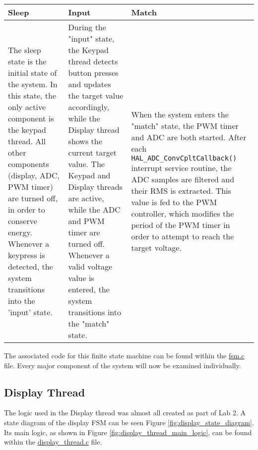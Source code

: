 \begin{tabular}{ p{} | p{} | p{}}
Sleep & Input & Match \\
\hline
The sleep state is the initial state of the system. In this state, the only active component is the keypad thread. All other components (display, ADC, PWM timer) are turned off, in order to conserve energy. Whenever a keypress is detected, the system transitions into the 'input' state.
&
During the "input" state, the Keypad thread detects button presses and updates the target value accordingly, while the Display thread shows the current target value. The Keypad and Display threads are active, while the ADC and PWM timer are turned off. Whenever a valid voltage value is entered, the system transitions into the "match" state.
&
When the system enters the "match" state, the PWM timer and ADC are both started. After each \verb|HAL_ADC_ConvCpltCallback()| interrupt service routine, the ADC samples are filtered and their RMS is extracted. This value is fed to the PWM controller, which modifies the period of the PWM timer in order to attempt to reach the target voltage.
\\
\end{tabular}


The associated code for this finite state machine can be found within the \href{https://github.com/lebrice/MicroP/blob/master/Lab4/Src/fsm.c}{fsm.c} file. Every major component of the system will now be examined individually.


\subsection{Display Thread}

\def \DISPLAYREFRESHINTERVAL {8ms}

The logic used in the Display thread was almost all created as part of Lab 2. A state diagram of the display FSM can be seen Figure \ref{fig:display_state_diagram}. Its main logic, as shown in Figure \ref{fig:display_thread_main_logic}, can be found within the \href{https://github.com/lebrice/MicroP/blob/master/Lab4/Src/display_thread.c}{display\_thread.c} file. \\ 



